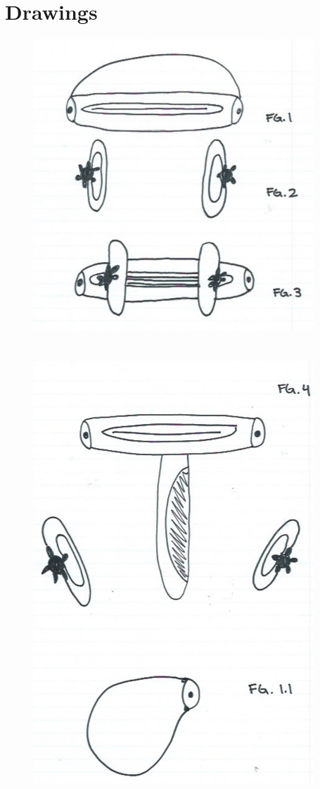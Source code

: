 \documentclass[twocolumn]{article}
\begin{document}
\section*{}
\section*{Drawings}
\begin{figure}[h]
    \centering
    \includegraphics[width=400px]{potatopeeler}
\end{figure}
\newpage
\section*{}
\newpage
\begin{figure}[h]
    \centering
    \includegraphics[width=400px]{potatopeeler2}
\end{figure}
\end{document}
